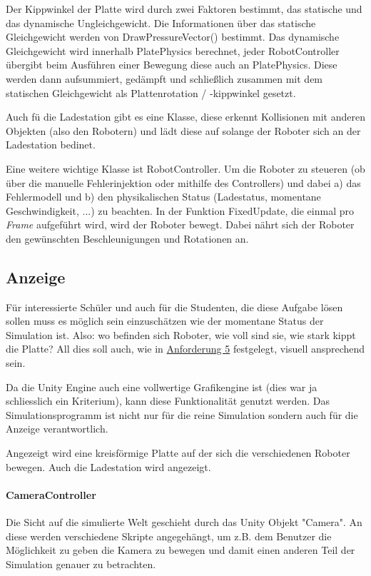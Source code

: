 Der Kippwinkel der Platte wird durch zwei Faktoren bestimmt, das statische und das dynamische Ungleichgewicht. Die Informationen {\"{u}}ber
das statische Gleichgewicht werden von DrawPressureVector() bestimmt. Das dynamische Gleichgewicht wird innerhalb PlatePhysics berechnet,
jeder RobotController {\"{u}}bergibt beim Ausf{\"{u}}hren einer Bewegung diese auch an PlatePhysics. Diese werden dann aufsummiert, ged{\"{a}}mpft
und schlie{\ss}lich zusammen mit dem statischen Gleichgewicht als Plattenrotation / -kippwinkel gesetzt.

Auch f{\"{u}} die Ladestation gibt es eine Klasse, diese erkennt Kollisionen mit anderen Objekten (also den Robotern) und l{\"{a}}dt diese auf
solange der Roboter sich an der Ladestation bedinet.

Eine weitere wichtige Klasse ist RobotController. Um die Roboter zu steueren (ob {\"{u}}ber die manuelle Fehlerinjektion oder mithilfe des
Controllers) und dabei a) das Fehlermodell und b) den physikalischen Status (Ladestatus, momentane Geschwindigkeit, ...) zu beachten. In der
Funktion FixedUpdate, die einmal pro \textit{Frame} aufgef{\"{u}}hrt wird, wird der Roboter bewegt. Dabei n{\"{a}}hrt sich der Roboter den
gew{\"{u}}nschten Beschleunigungen und Rotationen an.

\subsection{Anzeige}\label{graphics}
F{\"{u}}r interessierte Sch{\"{u}}ler und auch f{\"{u}}r die Studenten, die diese Aufgabe l{\"{o}}sen
sollen muss es m{\"{o}}glich sein einzusch{\"{a}}tzen wie der momentane Status der Simulation ist.
Also: wo befinden sich Roboter, wie voll sind sie, wie stark kippt die Platte? All dies soll auch, wie
in \hyperref[anforderung]{Anforderung 5} festgelegt, visuell ansprechend sein.

Da die Unity Engine auch eine vollwertige Grafikengine ist (dies war ja schliesslich ein Kriterium),
kann diese Funktionalit{\"{a}}t genutzt werden. Das Simulationsprogramm ist nicht nur f{\"{u}}r die
reine Simulation sondern auch f{\"{u}}r die Anzeige verantwortlich.

Angezeigt wird eine kreisf{\"{o}}rmige Platte auf der sich die verschiedenen Roboter bewegen. Auch die
Ladestation wird angezeigt.

\paragraph{CameraController} Die Sicht auf die simulierte Welt geschieht durch das Unity Objekt "Camera". An diese
werden verschiedene Skripte angegeh{\"{a}}ngt, um z.B. dem Benutzer die M{\"{o}}glichkeit zu
geben die Kamera zu bewegen und damit einen anderen Teil der Simulation genauer zu betrachten.

